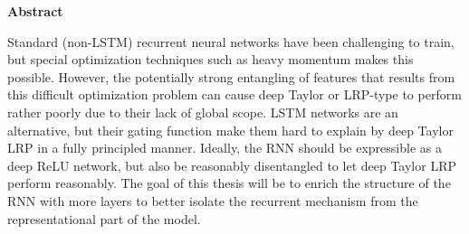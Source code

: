 \thispagestyle{empty}
\vspace*{1.0cm}

\begin{center}
    \textbf{Abstract}
\end{center}

\vspace*{0.5cm}

\noindent
Standard (non-LSTM) recurrent neural networks have been challenging to train, but special optimization techniques such as heavy momentum makes this possible. However, the potentially strong entangling of features that results from this difficult optimization problem can cause deep Taylor or LRP-type to perform rather poorly due to their lack of global scope. LSTM networks are an alternative, but their gating function make them hard to explain by deep Taylor LRP in a fully principled manner. Ideally, the RNN should be expressible as a deep ReLU network, but also be reasonably disentangled to let deep Taylor LRP perform reasonably. The goal of this thesis will be to enrich the structure of the RNN with more layers to better isolate the recurrent mechanism from the representational part of the model. 